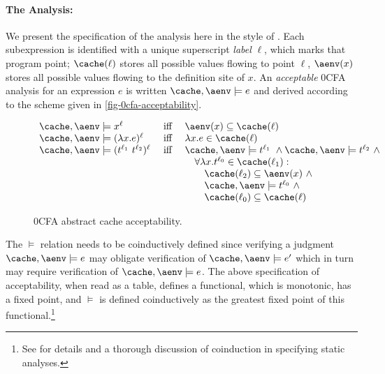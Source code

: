 \paragraph{The Analysis:} We present the specification of the analysis
here in the style of \citet{nielson-nielson-hankin}.  Each
subexpression is identified with a unique superscript {\em label}
$\ell$, which marks that program point; $\cache(\ell)$ stores all
possible values flowing to point $\ell$, $\aenv(x)$ stores all
possible values flowing to the definition site of $x$.  An {\em
  acceptable} 0CFA analysis for an expression $e$ is written
$\cache,\aenv\models e$ and derived according to the scheme given in
\autoref{fig-0cfa-acceptability}.

\begin{figure}[h]
\begin{displaymath}
\begin{array}{lcl}
\cache,\aenv \models x^\ell &
\mbox{ iff } &
\aenv(x) \subseteq \cache(\ell)\\
\cache,\aenv \models (\lambda x .e)^\ell &
\mbox{ iff } &
\lambda x.e \in \cache(\ell)\\
\cache,\aenv \models (t^{\ell_1}\ t^{\ell_2})^\ell &
\mbox{ iff } &
\cache,\aenv\models t^{\ell_1}\ \wedge
\cache,\aenv\models t^{\ell_2}\ \wedge \\
\ & \ & \quad \forall \lambda x.t^{\ell_0} \in \cache(\ell_1) : \\
\ & \ & \qquad \cache(\ell_2) \subseteq \aenv(x)\ \wedge\ \\
\ & \ & \qquad \cache,\aenv \models t^{\ell_0}\ \wedge \\
\ & \ & \qquad \cache(\ell_0) \subseteq \cache(\ell)
\end{array}
\end{displaymath}
\caption{0CFA abstract cache acceptability.}
\label{fig-0cfa-acceptability}
\end{figure}

The $\models$ relation needs to be coinductively defined since
verifying a judgment $\cache,\aenv \models e$ may obligate
verification of $\cache,\aenv \models e'$ which in turn may require
verification of $\cache,\aenv \models e$.  The above specification of
acceptability, when read as a table, defines a functional, which is
monotonic, has a fixed point, and $\models$ is defined coinductively
as the greatest fixed point of this functional.\footnote{See
  \citet{nielson-nielson-hankin} for details and a thorough discussion
  of coinduction in specifying static analyses.}

